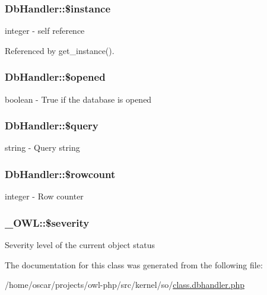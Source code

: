 \subsubsection[{\$instance}]{\setlength{\rightskip}{0pt plus 5cm}DbHandler::\$instance}\label{classDbHandler_a0859a862eac3e8ba14c6d04de0396710}
integer -\/ self reference 

Referenced by get\_\-instance().

\subsubsection[{\$opened}]{\setlength{\rightskip}{0pt plus 5cm}DbHandler::\$opened}\label{classDbHandler_a71e36ffbff0d157b1d91dc000bc6f821}
boolean -\/ True if the database is opened 
\subsubsection[{\$query}]{\setlength{\rightskip}{0pt plus 5cm}DbHandler::\$query}\label{classDbHandler_ad671b5596b37dac6d48a660a07775965}
string -\/ Query string 
\subsubsection[{\$rowcount}]{\setlength{\rightskip}{0pt plus 5cm}DbHandler::\$rowcount}\label{classDbHandler_a56a7ae4bd7d842c85f3fe8052aecbfef}
integer -\/ Row counter 
\subsubsection[{\$severity}]{\setlength{\rightskip}{0pt plus 5cm}\_\-OWL::\$severity}\label{class__OWL_ad26b40a9dbbacb33e299b17826f8327c}
Severity level of the current object status 

The documentation for this class was generated from the following file:\begin{DoxyCompactItemize}
\item 
/home/oscar/projects/owl-\/php/src/kernel/so/\hyperlink{class_8dbhandler_8php}{class.dbhandler.php}\end{DoxyCompactItemize}
